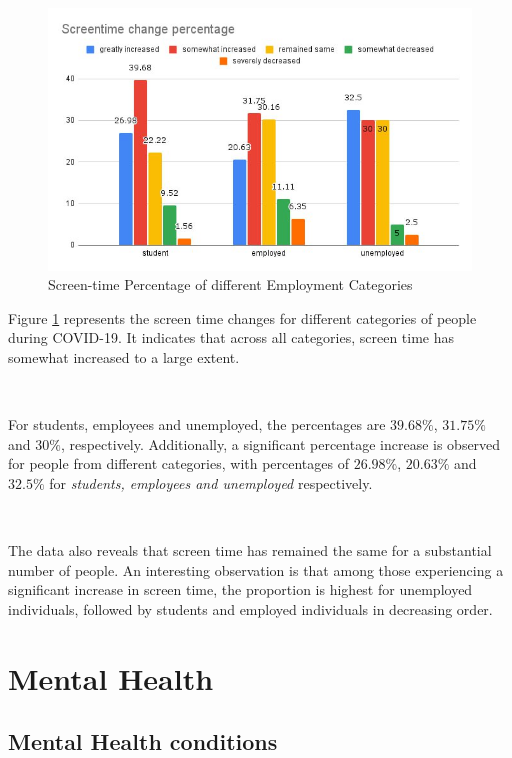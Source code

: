 \begin{figure}[h!]
	\centering
	\includegraphics[width=0.79\linewidth]{IMAGES/Image 10.jpeg}
	\caption{Screen-time Percentage of different Employment Categories}
	\label{G10}
\end{figure}

\newpage

Figure \ref{G10} represents the screen time changes for different categories of people during COVID-19. It indicates that across all categories, screen time has somewhat increased to a large extent.

\ 

For students, employees and unemployed, the percentages are $39.68\%$, $31.75\%$ and $30\%$, respectively. Additionally, a significant percentage increase is observed for people from different categories, with percentages of $26.98\%$, $20.63\%$ and $32.5\%$ for \textit{students, employees and unemployed} respectively.

\

The data also reveals that screen time has remained the same for a substantial number of people. An interesting observation is that among those experiencing a significant increase in screen time, the proportion is highest for unemployed individuals, followed by students and employed individuals in decreasing order.

\section{Mental Health}

\subsection{Mental Health conditions}

